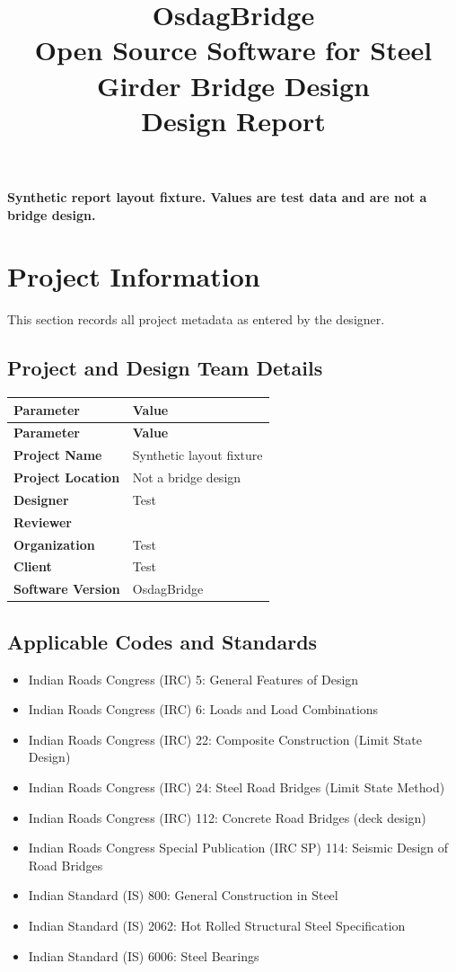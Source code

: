 \documentclass[12pt,a4paper]{report}
\title{\Large\textbf{OsdagBridge} \\ \normalsize Open Source Software for Steel Girder Bridge Design \\ \vspace{2cm} \large Design Report}
\author{}
\date{}
\numberwithin{table}{chapter}
\numberwithin{figure}{chapter}
\renewcommand{\arraystretch}{1.12}
\newcommand{\ReportSectionStyle}{\small\setlength{\tabcolsep}{3pt}\renewcommand{\arraystretch}{1.15}}
\begin{document}
\noindent\textbf{Synthetic report layout fixture. Values are test data and are not a bridge design.}
\ReportSectionStyle

\chapter{Project Information}

This section records all project metadata as entered by the designer.

\section{Project and Design Team Details}
\label{sec:project-details}

\begin{longtable}{|L{5.5cm}|L{8.5cm}|}
\hline
\textbf{Parameter} & \textbf{Value} \\
\hline
\endfirsthead
\hline
\textbf{Parameter} & \textbf{Value} \\
\hline
\endhead

\textbf{Project Name} & Synthetic layout fixture \\
\hline
\textbf{Project Location} & Not a bridge design \\
\hline
\textbf{Designer} & Test \\
\hline
\textbf{Reviewer} &  \\
\hline
\textbf{Organization} & Test \\
\hline
\textbf{Client} & Test \\
\hline
\textbf{Software Version} & OsdagBridge \\
\hline
\end{longtable}


\section{Applicable Codes and Standards}
\label{sec:codes}

\begin{itemize}
\item Indian Roads Congress (IRC) 5: General Features of Design
\item Indian Roads Congress (IRC) 6: Loads and Load Combinations
\item Indian Roads Congress (IRC) 22: Composite Construction (Limit State Design)
\item Indian Roads Congress (IRC) 24: Steel Road Bridges (Limit State Method)
\item Indian Roads Congress (IRC) 112: Concrete Road Bridges (deck design)
\item Indian Roads Congress Special Publication (IRC SP) 114: Seismic Design of Road Bridges
\item Indian Standard (IS) 800: General Construction in Steel
\item Indian Standard (IS) 2062: Hot Rolled Structural Steel Specification
\item Indian Standard (IS) 6006: Steel Bearings
\end{itemize}
\end{document}
